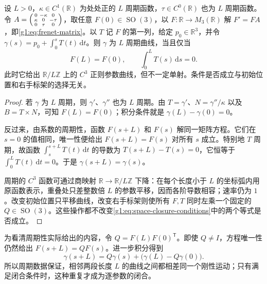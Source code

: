 \begin{proposition}
	\label{g1:prop:periodic-curve-closure}
	设 \(L>0\)，\(\kappa\in C^1(\mathbb R)\) 为处处正的 \(L\) 周期函数，\(\tau\in C^0(\mathbb R)\) 也为 \(L\) 周期函数。令 \(A=\begin{psmallmatrix}0&-\kappa&0\\\kappa&0&-\tau\\0&\tau&0\end{psmallmatrix}\)，取任意 \(F(0)\in\operatorname{SO}(3)\)，以 \(F:\mathbb R\to M_3(\mathbb R)\) 解 \(F'=FA\)，即\eqref{g1:eq:frenet-matrix}。以 \(T\) 记 \(F\) 的第一列，给定 \(p_0\in\mathbb R^3\)，并令 \(\gamma(s)=p_0+\int_0^sT(t)\,\mathrm{d}t\)。则 \(\gamma\) 为 \(L\) 周期曲线，当且仅当
	\begin{equation}
		\label{g1:eq:space-closure-conditions}
		F(L)=F(0),\qquad \int_0^L T(s)\,\mathrm{d}s=0.
	\end{equation}
	此时它给出 \(\mathbb R/L\mathbb Z\) 上的 \(C^3\) 正则参数曲线，但不一定单射。条件是否成立与初始位置和右手标架的选择无关。
\end{proposition}

\begin{proof}
	若 \(\gamma\) 为 \(L\) 周期，则 \(\gamma'\)、\(\gamma''\) 也为 \(L\) 周期。由 \(T=\gamma'\)、\(N=\gamma''/\kappa\) 以及 \(B=T\times N\)，可知 \(F(L)=F(0)\)；积分条件就是 \(\gamma(L)-\gamma(0)=0\)。

	反过来，由系数的周期性，函数 \(F(s+L)\) 和 \(F(s)\) 解同一矩阵方程。它们在 \(s=0\) 的值相同，唯一性便给出 \(F(s+L)=F(s)\) 对所有 \(s\) 成立。特别地 \(T\) 周期，故函数 \(\int_s^{s+L}T(t)\,\mathrm{d}t\) 的导数为 \(T(s+L)-T(s)=0\)，它恒等于 \(\int_0^L T(t)\,\mathrm{d}t=0\)。于是 \(\gamma(s+L)=\gamma(s)\)。

	周期的 \(C^3\) 函数可通过商映射 \(\mathbb R\to\mathbb R/L\mathbb Z\) 下降：在每个长度小于 \(L\) 的坐标弧内用原函数表示，重叠处只差整数倍 \(L\) 的参数平移，因而各阶导数相容；速率仍为 \(1\)。改变初始位置只平移曲线，改变右手标架则使所有 \(F,T\) 同时左乘一个固定的 \(Q\in \operatorname{SO}(3)\)。这些操作都不改变\eqref{g1:eq:space-closure-conditions}中的两个等式是否成立。
\end{proof}

为看清周期性实际给出的内容，令 \(Q=F(L)F(0)^{\mathsf T}\)。即使 \(Q\ne I\)，方程唯一性仍然给出 \(F(s+L)=QF(s)\)。进一步积分得到
\[
	\gamma(s+L)=Q\gamma(s)+\bigl(\gamma(L)-Q\gamma(0)\bigr).
\]
所以周期数据保证，相邻两段长度 \(L\) 的曲线之间都相差同一个刚性运动；只有满足闭合条件时，这种重复才成为逐参数的闭合。

